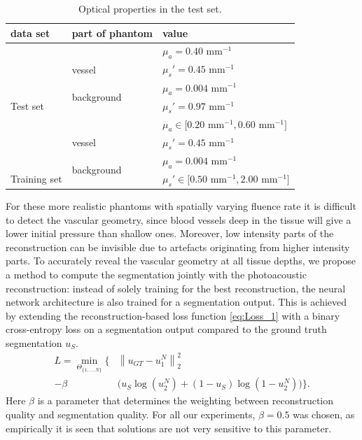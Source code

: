 \documentclass[journal]{IEEEtran}
\newcommand{\norm}[1]{\left\lVert#1\right\rVert}
\begin{document}
\begin{table}[ht!]
\vspace{2mm}
\caption {Optical properties in the test set.}
\vspace{-3mm}
\begin{center}
\bgroup
\def\arraystretch{1.15}
\begin{tabular}{ l | l | l } 
 \hline
\textbf{data set} & \textbf{part of phantom} & \textbf{value}\\
\hline \hline
\cellcolor{gray!10}& \cellcolor{gray!25} & \cellcolor{gray!25}$\mu_a=0.40$ mm$^{-1}$\\ 
\cellcolor{gray!10}& \multirow{-2}{*}{\cellcolor{gray!25} vessel} & \cellcolor{gray!25}$\mu_s'=0.45$ mm$^{-1}$\\ \cline{2-3}
\cellcolor{gray!10}& \multirow{2}{*}{background} & $\mu_a=0.004$ mm$^{-1}$\\ 
\multirow{-4}{*}{\cellcolor{gray!10} Test set}& & $\mu_s'=0.97$ mm$^{-1}$\\
 \hline \hline
\cellcolor{gray!10} & \cellcolor{gray!25} & \cellcolor{gray!25}$\mu_a\in\big[0.20$ mm$^{-1}, 0.60$ mm$^{-1}\big]$\\ 
\cellcolor{gray!10} & \multirow{-2}{*}{\cellcolor{gray!25} vessel} & \cellcolor{gray!25}$\mu_s'=0.45$ mm$^{-1}$\\ \cline{2-3}
\cellcolor{gray!10}& \multirow{2}{*}{background} & $\mu_a=0.004$ mm$^{-1}$\\ 
\multirow{-4}{*}{\cellcolor{gray!10} Training set} & & $\mu_s'\in\big[0.50$ mm$^{-1}, 2.00$ mm$^{-1}\big]$\\
 \hline
\end{tabular}
\egroup
\end{center}\label{tab:opt_prop}
\vspace{-4mm}
\end{table} 

For these more realistic phantoms with spatially varying fluence rate it is difficult to detect the vascular geometry, since blood vessels deep in the tissue will give a lower initial pressure than shallow ones. Moreover, low intensity parts of the reconstruction can be invisible due to artefacts originating from higher intensity parts. To accurately reveal the vascular geometry at all tissue depths, we propose a method to compute the segmentation jointly with the photoacoustic reconstruction: instead of solely training for the best reconstruction, the neural network architecture is also trained for a segmentation output. This is achieved by extending the reconstruction-based loss function \eqref{eq:Loss_1} with a binary cross-entropy loss on a segmentation output compared to the ground truth segmentation $u_S$.
\begin{align}\label{eq:Loss_2}
L=\min_{\Theta_{\{1,\dots,N\}}}\Big\{&\norm{u_{GT}-u_1^N}^2_2 \\- \beta &\Big(u_S\log(u_2^N)+(1-u_S)\log(1-u_2^N)\Big)\Big\}.\nonumber
\end{align}
Here $\beta$ is a parameter that determines the weighting between reconstruction quality and segmentation quality. For all our experiments, $\beta=0.5$ was chosen, as empirically it is seen that solutions are not very sensitive to this parameter.
\end{document}

